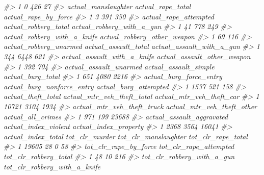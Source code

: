 \documentclass[
  12pt,
]{book}
\newenvironment{Shaded}{\begin{snugshade}}{\end{snugshade}}
\newcommand{\CommentTok}[1]{\textcolor[rgb]{0.37,0.37,0.37}{\textit{#1}}}
\begin{document}
\begin{Shaded}
\begin{Highlighting}[]
\CommentTok{\#\textgreater{} 1                           0                426            27}
\CommentTok{\#\textgreater{}   actual\_manslaughter actual\_rape\_total actual\_rape\_by\_force}
\CommentTok{\#\textgreater{} 1                   3               391                  350}
\CommentTok{\#\textgreater{}   actual\_rape\_attempted actual\_robbery\_total actual\_robbery\_with\_a\_gun}
\CommentTok{\#\textgreater{} 1                    41                  778                       249}
\CommentTok{\#\textgreater{}   actual\_robbery\_with\_a\_knife actual\_robbery\_other\_weapon}
\CommentTok{\#\textgreater{} 1                          69                         116}
\CommentTok{\#\textgreater{}   actual\_robbery\_unarmed actual\_assault\_total actual\_assault\_with\_a\_gun}
\CommentTok{\#\textgreater{} 1                    344                 6448                       621}
\CommentTok{\#\textgreater{}   actual\_assault\_with\_a\_knife actual\_assault\_other\_weapon}
\CommentTok{\#\textgreater{} 1                         392                         704}
\CommentTok{\#\textgreater{}   actual\_assault\_unarmed actual\_assault\_simple actual\_burg\_total}
\CommentTok{\#\textgreater{} 1                    651                  4080              2216}
\CommentTok{\#\textgreater{}   actual\_burg\_force\_entry actual\_burg\_nonforce\_entry actual\_burg\_attempted}
\CommentTok{\#\textgreater{} 1                    1537                        521                   158}
\CommentTok{\#\textgreater{}   actual\_theft\_total actual\_mtr\_veh\_theft\_total actual\_mtr\_veh\_theft\_car}
\CommentTok{\#\textgreater{} 1              10721                       3104                     1934}
\CommentTok{\#\textgreater{}   actual\_mtr\_veh\_theft\_truck actual\_mtr\_veh\_theft\_other actual\_all\_crimes}
\CommentTok{\#\textgreater{} 1                        971                        199             23688}
\CommentTok{\#\textgreater{}   actual\_assault\_aggravated actual\_index\_violent actual\_index\_property}
\CommentTok{\#\textgreater{} 1                      2368                 3564                 16041}
\CommentTok{\#\textgreater{}   actual\_index\_total tot\_clr\_murder tot\_clr\_manslaughter tot\_clr\_rape\_total}
\CommentTok{\#\textgreater{} 1              19605             28                    0                 58}
\CommentTok{\#\textgreater{}   tot\_clr\_rape\_by\_force tot\_clr\_rape\_attempted tot\_clr\_robbery\_total}
\CommentTok{\#\textgreater{} 1                    48                     10                   216}
\CommentTok{\#\textgreater{}   tot\_clr\_robbery\_with\_a\_gun tot\_clr\_robbery\_with\_a\_knife}

\end{Highlighting}
\end{Shaded}
\end{document}

